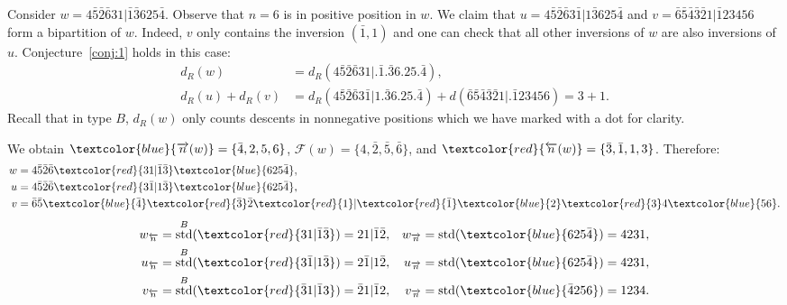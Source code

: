 \documentclass[ALCO,Unicode]{cedram}
\theoremstyle{definition}
\DeclareMathOperator{\std}{std}
\newcommand{\R}{{\overrightarrow{n}}}
\newcommand{\LL}{{\overleftarrow{n}}}
\newcommand{\dd}{d_R}
\newcommand{\Bstd}{\std^{B}}
\newcommand{\F}{\mathcal{F}}
\newcommand{\red}[1]{\textcolor{red}{#1}}
\newcommand{\blue}[1]{\textcolor{blue}{#1}}
\begin{document}
\begin{ex}
\label{ex:typeB-pos1}
Consider $w = 4 \bar{5} \bar{2} \bar{6} 3 1 | \bar{1} \bar{3} 6 2 5 \bar{4}$. Observe that $n=6$ is in positive position in $w$. We claim that $u = 4 \bar{5} \bar{2} \bar{6} 3 \bar{1} | 1 \bar{3} 6 2 5 \bar{4}$ and $v = \bar{6} \bar{5} \bar{4} \bar{3} \bar{2} 1 | \bar{1} 2 3 4 5 6$ form a bipartition of $w$. Indeed, $v$ only contains the inversion $(\bar{1}, 1)$ and one can check that all other inversions of $w$ are also inversions of $u$. Conjecture~\ref{conj:1} holds in this case: 
\begin{align*}
\dd(w) &= \dd(4 \bar{5} \bar{2} \bar{6} 3 1 |. \bar{1}. \bar{3} 6. 2 5. \bar{4}), \\
\dd(u) + \dd(v) &= \dd(4 \bar{5} \bar{2} \bar{6} 3 \bar{1} | 1 . \bar{3} 6 . 2 5 . \bar{4}) + d(\bar{6} \bar{5} \bar{4} \bar{3} \bar{2} 1 |. \bar{1} 2 3 4 5 6) = 3 + 1.
\end{align*}
Recall that in type $B$, $\dd(w)$ only counts descents in nonnegative positions which we have marked with a dot for clarity.



We obtain $\blue{\R(w)} = \lbrace \bar{4}, 2, 5, 6 \rbrace$, $\F(w) = \lbrace 4, \bar{2}, \bar{5}, \bar{6} \rbrace$, and $\red{\LL(w)} = \lbrace \bar{3}, \bar{1}, 1, 3 \rbrace$. Therefore:
\begin{align*}
w &=   4 \bar{5} \bar{2} \bar{6} \red{ 3 1 | \bar{1} \bar{3}} \blue{ 6 2 5 \bar{4}} ,\\
u &= 4 \bar{5} \bar{2} \bar{6} \red{ 3 \bar{1} | 1 \bar{3}} \blue{ 6 2 5 \bar{4}}, \\
v &= \bar{6} \bar{5} \blue{\bar{4}} \red{\bar{3}} \bar{2} \red{1} | \red{\bar{1}} \blue{2} \red{3} 4 \blue{5 6}.
\end{align*}
\begin{align*}
w_\LL &= \Bstd(\red{31 | \bar{1} \bar{3}}) = 2 1 | \bar{1} \bar{2}, & w_\R &= \std(\blue{6 2 5 \bar{4}}) = 4 2 3 1 ,\\
u_\LL &= \Bstd(\red{3 \bar{1} | 1 \bar{3}}) = 2 \bar{1} | 1 \bar{2}, & u_\R &= \std(\blue{6 2 5 \bar{4}}) = 4 2 3 1, \\
v_\LL &= \Bstd(\red{\bar{3} 1 | \bar{1} 3}) = \bar{2} 1 | \bar{1} 2, & v_\R &= \std(\blue{\bar{4} 2 5 6}) = 1 2 3 4. 
\end{align*}
\end{ex}
\end{document}
